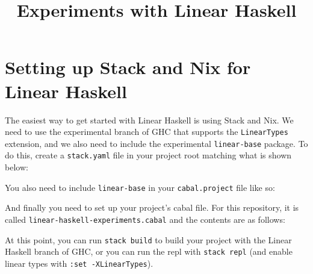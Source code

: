 \documentclass[fullpage]{article}
\title{Experiments with Linear Haskell}
\begin{document}
\maketitle
\tableofcontents
\section{Setting up Stack and Nix for Linear Haskell}
The easiest way to get started with Linear Haskell is using Stack and Nix. We need to use the experimental branch of GHC that supports the \texttt{LinearTypes} extension, and we also need to include the experimental \texttt{linear-base} package. To do this, create a \texttt{stack.yaml} file in your project root matching what is shown below:

You also need to include \texttt{linear-base} in your \texttt{cabal.project} file like so:

And finally you need to set up your project's cabal file. For this repository, it is called \texttt{linear-haskell-experiments.cabal} and the contents are as follows:

At this point, you can run \texttt{stack build} to build your project with the Linear Haskell branch of GHC, or you can run the repl with \texttt{stack repl} (and enable linear types with \texttt{:set -XLinearTypes}).


\end{document}
